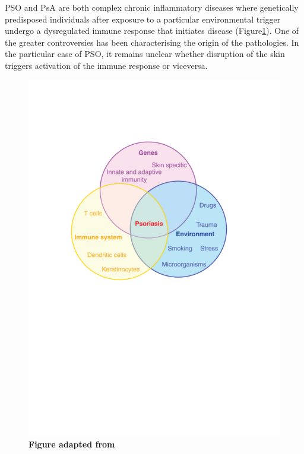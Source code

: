 PSO and PsA are both complex chronic inflammatory diseases where genetically predisposed individuals after exposure to a particular environmental trigger undergo a dysregulated immune response that initiates disease (Figure\ref{fig:PSO_aetiology_diagram}). One of the greater controversies has been characterising the origin of the pathologies. In the particular case of PSO, it remains unclear whether disruption of the skin triggers activation of the immune response or viceversa.

\begin{figure}[H]
\includegraphics[width=\textwidth]{./Introduction/pdfs/PSO_aetiology_diagram_Di_Meglio_et_al_2014.pdf}
\caption[Main factors involved in PSO disease aetiology]{\textbf{Figure adapted from \parencite{Meglio2014}}}
\label{fig:PSO_aetiology_diagram}
\end{figure}

